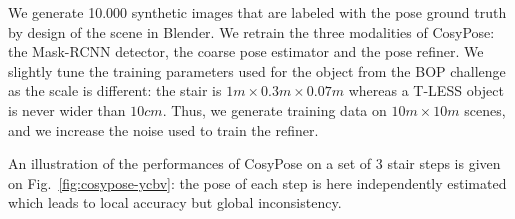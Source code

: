 We generate 10.000 synthetic images that are labeled with the pose ground truth by design of the scene in Blender. We retrain the three modalities of CosyPose: 
the Mask-RCNN detector, the coarse pose estimator and the pose refiner. We slightly tune the training parameters used for the object from the BOP challenge as 
the scale is different: the stair is $1m \times 0.3m \times 0.07m$ whereas a T-LESS object is never wider than $10cm$. 
Thus, we generate training data on $10m \times 10m$ scenes, and we increase the noise used to train the refiner.  

An illustration of the performances of CosyPose on a set of 3 stair steps is given on Fig.~\ref{fig:cosypose-ycbv}: 
the pose of each step is here independently estimated which leads to local accuracy but global inconsistency. 